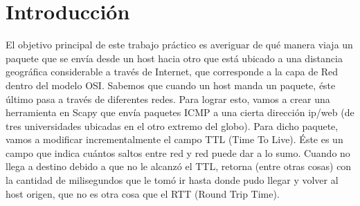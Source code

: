 \section{Introducción}
\PARstart El objetivo principal de este trabajo práctico es averiguar de qué manera viaja un paquete 
que se envía desde un host hacia otro que está ubicado a una distancia geográfica considerable a través de Internet, que corresponde a la capa de Red dentro del modelo OSI.
Sabemos que cuando un host manda un paquete, éste último pasa a través de diferentes redes. Para lograr esto, vamos a crear una herramienta en Scapy que envía paquetes ICMP
 a una cierta dirección ip/web (de tres universidades ubicadas en el otro extremo del globo). 
Para dicho paquete, vamos a modificar incrementalmente el campo TTL (Time To Live). 
Éste es un campo que indica cuántos saltos entre red y red puede dar a lo sumo. Cuando no llega a destino debido a que no le alcanzó el TTL, 
retorna (entre otras cosas) con la cantidad de milisegundos que le tomó ir hasta donde pudo llegar y volver al host origen,
que no es otra cosa que el RTT (Round Trip Time).
